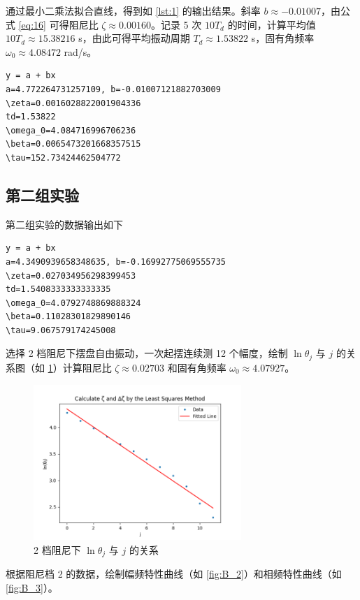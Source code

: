 \documentclass[12pt,a4paper]{amsart}
\begin{document}
通过最小二乘法拟合直线，得到如 \ref{lst:1} 的输出结果。斜率 $b \approx -0.01007$，由公式 \ref{eq:16} 可得阻尼比 $\zeta \approx 0.00160$。记录 5 次 $10T_d$ 的时间，计算平均值 $10T_d \approx 15.38216$ s，由此可得平均振动周期 $T_d \approx 1.53822$ s，固有角频率 $\omega_0 \approx 4.08472$ rad/s。

\begin{lstlisting}[caption={第一组实验数据处理结果}, label={lst:1}]
y = a + bx
a=4.772264731257109, b=-0.01007121882703009
\zeta=0.0016028822001904336
td=1.53822
\omega_0=4.084716996706236
\beta=0.0065473201668357515
\tau=152.73424462504772
\end{lstlisting}

\subsection{第二组实验}

第二组实验的数据输出如下

\begin{lstlisting}[label={lst:2}, caption={第二组实验数据处理结果}]
y = a + bx
a=4.3490939658348635, b=-0.16992775069555735
\zeta=0.027034956298399453
td=1.5408333333333335
\omega_0=4.0792748869888324
\beta=0.11028301829890146
\tau=9.067579174245008
\end{lstlisting}

选择 2 档阻尼下摆盘自由振动，一次起摆连续测 12 个幅度，绘制 $\ln\theta_j$ 与 $j$ 的关系图（如 \ref{fig:B_1}）计算阻尼比 $\zeta \approx 0.02703$ 和固有角频率 $\omega_0 \approx 4.07927$。

\begin{figure}[H]
	\centering
	\includegraphics[width=0.7\textwidth]{img/B_1.png}
	\caption{2 档阻尼下 $\ln\theta_j$ 与 $j$ 的关系}
	\label{fig:B_1}
\end{figure}

根据阻尼档 2 的数据，绘制幅频特性曲线（如 \ref{fig:B_2}）和相频特性曲线（如 \ref{fig:B_3}）。
\end{document}
